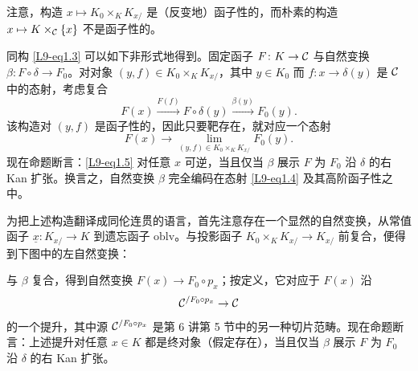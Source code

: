 \begin{remark}\label{L9-1.10}
注意，构造 $x\mapsto K_0\times_K K_{x/}$ 是（反变地）函子性的，而朴素的构造 $x\mapsto K\times_{\mathcal{C}}\{x\}$ 不是函子性的。
\end{remark}

\begin{remark}\label{L9-1.11}
同构 \eqref{L9-eq1.3} 可以如下非形式地得到。固定函子 $F\colon K\to\mathcal{C}$ 与自然变换 $\beta\colon F\circ\delta\to F_0$。对对象 $(y,f)\in K_0\times_K K_{x/}$，其中 $y\in K_0$ 而 $f\colon x\to\delta(y)$ 是 $\mathcal{C}$ 中的态射，考虑复合
\begin{equation}\label{L9-eq1.4}
F(x)\xrightarrow{F(f)}F\circ\delta(y)\xrightarrow{\beta(y)}F_0(y).
\end{equation}
该构造对 $(y,f)$ 是函子性的，因此只要靶存在，就对应一个态射
\begin{equation}\label{L9-eq1.5}
F(x)\to\lim_{(y,f)\in K_0\times_K K_{x/}}F_0(y).
\end{equation}
现在命题断言：\eqref{L9-eq1.5} 对任意 $x$ 可逆，当且仅当 $\beta$ 展示 $F$ 为 $F_0$ 沿 $\delta$ 的右 Kan 扩张。换言之，自然变换 $\beta$ 完全编码在态射 \eqref{L9-eq1.4} 及其高阶函子性之中。
\end{remark}

\begin{remark}\label{L9-1.12}
为把上述构造翻译成同伦连贯的语言，首先注意存在一个显然的自然变换，从常值函子 $\underline{x}\colon K_{x/}\to K$ 到遗忘函子 $\mathrm{oblv}$。与投影函子 $K_0\times_K K_{x/}\to K_{x/}$ 前复合，便得到下图中的左自然变换：
\begin{center}
\end{center}
与 $\beta$ 复合，得到自然变换 $F(x)\to F_0\circ p_x$；按定义，它对应于 $F(x)$ 沿
\[
\mathcal{C}^{/F_0\circ p_x}\to\mathcal{C}
\]
的一个提升，其中源 $\mathcal{C}^{/F_0\circ p_x}$ 是第 6 讲第 5 节中的另一种切片范畴。现在命题断言：上述提升对任意 $x\in K$ 都是终对象（假定存在），当且仅当 $\beta$ 展示 $F$ 为 $F_0$ 沿 $\delta$ 的右 Kan 扩张。
\end{remark}

